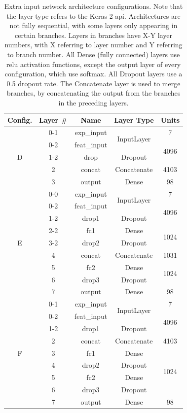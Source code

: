 \begin{table}[h!]
\begin{center}
\begin{tabular}{|c|c|c|c|c|}
\hline
\textbf{Config.} & \textbf{Layer \#} & \textbf{Name} & \textbf{Layer Type} & \textbf{Units} \\ \hline
\multirow{5}{*}{D} & 0-1 & exp\_input & \multirow{2}{*}{InputLayer} & 7 \\ \cline{2-3} \cline{5-5}
 & 0-2 & feat\_input & & \multirow{2}{*}{4096} \\ \cline{2-4}
 & 1-2 & drop & Dropout & \\ \cline{2-5}
 & 2 & concat & Concatenate & 4103 \\ \cline{2-5}
 & 3 & output & Dense & 98 \\ \hline
\multirow{9}{*}{E} & 0-0 & exp\_input & \multirow{2}{*}{InputLayer} & 7 \\ \cline{2-3} \cline{5-5}
 & 0-2 & feat\_input & & \multirow{2}{*}{4096} \\ \cline{2-4}
 & 1-2 & drop1 & Dropout & \\ \cline{2-5}
 & 2-2 & fc1 & Dense & \multirow{2}{*}{1024} \\ \cline{2-4}
 & 3-2 & drop2 & Dropout & \\ \cline{2-5}
 & 4 & concat & Concatenate & 1031 \\ \cline{2-5}
 & 5 & fc2 & Dense & \multirow{2}{*}{1024} \\ \cline{2-4}
 & 6 & drop3 & Dropout & \\ \cline{2-5}
 & 7 & output & Dense & 98 \\ \hline
\multirow{9}{*}{F} & 0-1 & exp\_input & \multirow{2}{*}{InputLayer} & 7 \\ \cline{2-3} \cline{5-5}
 & 0-2 & feat\_input & & \multirow{2}{*}{4096} \\ \cline{2-4}
 & 1-2 & drop1 & Dropout & \\ \cline{2-5}
 & 2 & concat & Concatenate & 4103 \\ \cline{2-5}
 & 3 & fc1 & Dense & \multirow{4}{*}{1024} \\ \cline{2-4}
 & 4 & drop2 & Dropout & \\ \cline{2-4}
 & 5 & fc2 & Dense & \\ \cline{2-4}
 & 6 & drop3 & Dropout & \\ \cline{2-5}
 & 7 & output & Dense & 98 \\ \hline 
\end{tabular}
\end{center}
\caption[Extra input architecture configurations]{Extra input network architecture configurations. Note that the layer type refers to the Keras 2 \acrshort{api}. Architectures are not fully sequential, with some layers only appearing in certain branches. Layers in branches have X-Y layer numbers, with X referring to layer number and Y referring to branch number. All Dense (fully connected) layers use \acrshort{relu} activation functions, except the output layer of every configuration, which use softmax. All Dropout layers use a 0.5 dropout rate. The Concatenate layer is used to merge branches, by concatenating the output from the branches in the preceding layers.}
\label{tab:ex-in-arch}
\end{table}



